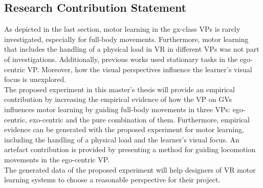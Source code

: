 \subsection{Research Contribution Statement}
\label{sec:delimination_contribution}
As depicted in the last section, motor learning in the gx-class VPs is rarely investigated, especially for full-body movements. Furthermore, motor learning that includes the handling of a physical load in VR in different VPs was not part of investigations. Additionally, previous works used stationary tasks in the ego-centric VP. Moreover, how the visual perspectives influence the learner's visual focus is unexplored.\\
The proposed experiment in this master's thesis will provide an empirical contribution by increasing the empirical evidence of how the VP on GVs influences motor learning by guiding full-body movements in three VPs: ego-centric, exo-centric and the pure combination of them. Furthermore, empirical evidence can be generated with the proposed experiment for motor learning, including the handling of a physical load and the learner's visual focus. An artefact contribution is provided by presenting a method for guiding locomotion movements in the ego-centric VP. \\

The generated data of the proposed experiment will help designers of VR motor learning systems to choose a reasonable perspective for their project.



